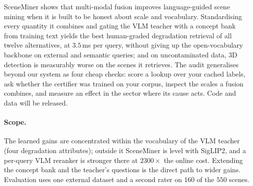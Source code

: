 \documentclass[10pt,twocolumn,letterpaper]{article}
\begin{document}
SceneMiner shows that multi-modal fusion improves language-guided scene mining when
it is built to be honest about scale and vocabulary. Standardising every quantity
it combines and gating the VLM teacher with a concept bank from training text yields
the best human-graded degradation retrieval of all twelve alternatives, at
$3.5$\,ms per query, without giving up the open-vocabulary backbone on external
and semantic queries; and on uncontaminated data, 3D detection is measurably worse on
the scenes it retrieves. The audit generalises beyond our system as four cheap
checks: score a lookup over your cached labels, ask whether the certifier was trained
on your corpus, inspect the scales a fusion combines, and measure an effect in the
sector where its cause acts. Code and data will be released.

\paragraph{Scope.} The learned gains are concentrated within the vocabulary of the
VLM teacher (four degradation attributes); outside it SceneMiner is level with
SigLIP2, and a per-query VLM reranker is stronger there at $2300\times$ the online
cost. Extending the concept bank and the teacher's questions is the direct path to
wider gains. Evaluation uses one external dataset and a second rater on $160$ of the
$550$ scenes.

\clearpage
{
    \small
    
    
}
\end{document}
